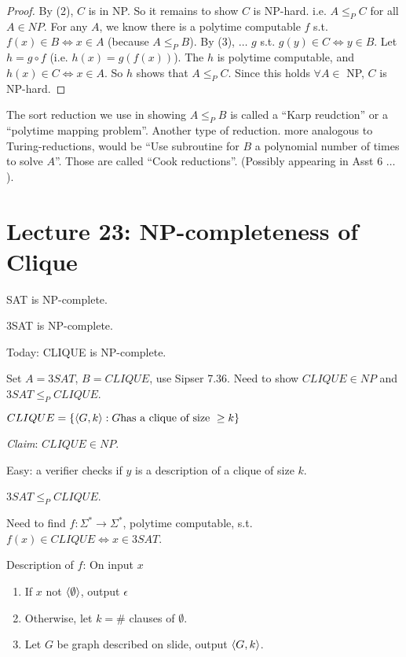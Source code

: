 \begin{proof}
    By (2), $C$ is in NP. So it remains to show $C$ is NP-hard. i.e. $A \leq_{P} C$ for all $A \in NP$. For any $A$, we know there is a polytime computable $f$ s.t. $f(x) \in B \Leftrightarrow x \in A$ (because $A \leq_{P} B$). By (3), $\ldots$ $g$  s.t. $g(y) \in C \Leftrightarrow y \in B$. Let $h = g \circ f$ (i.e. $h(x) = g(f(x))$). The $h$ is polytime computable, and $h(x) \in C \Leftrightarrow x \in A$. So $h$ shows that $A \leq_{P} C$. Since this holds $\forall A \in$ NP, $C$ is NP-hard.
\end{proof}

The sort reduction we use in showing $A \leq_{P} B$ is called a ``Karp reudction'' or a ``polytime mapping problem''. Another type of reduction. more analogous to Turing-reductions, would be ``Use subroutine for $B$ a polynomial number of times to solve $A$''. Those are called ``Cook reductions''. (Possibly appearing in Asst 6 $\dots$).

\section*{Lecture 23: NP-completeness of Clique}

\begin{theorem}
    SAT is NP-complete.
\end{theorem}

\begin{corollary}
    3SAT is NP-complete.
\end{corollary}

Today: CLIQUE is NP-complete.

Set $A = 3SAT$, $B = CLIQUE$, use Sipser 7.36. Need to show $CLIQUE \in NP$ and $3SAT \leq_{P} CLIQUE$.

$CLIQUE = \left \{ \left \langle G, k \right \rangle : G \text{has a clique of size } \geq k \right \}$

\emph{Claim}: $CLIQUE \in NP$.

Easy: a verifier checks if $y$ is a description of a clique of size $k$.

\begin{theorem}[Sipser 7.32]
    $3SAT \leq_{P} CLIQUE$.
\end{theorem}

Need to find $f : \Sigma^* \rightarrow \Sigma^*$, polytime computable, s.t. $f(x) \in CLIQUE \Leftrightarrow x \in 3SAT$.

Description of $f$: On input $x$

\begin{enumerate}
    \item If $x$ not $\left \langle \emptyset \right \rangle$, output $\epsilon$
    \item Otherwise, let $k = \#$ clauses of $\emptyset$.
    \item Let $G$ be graph described on slide, output $\left \langle G, k \right \rangle$.
\end{enumerate}

